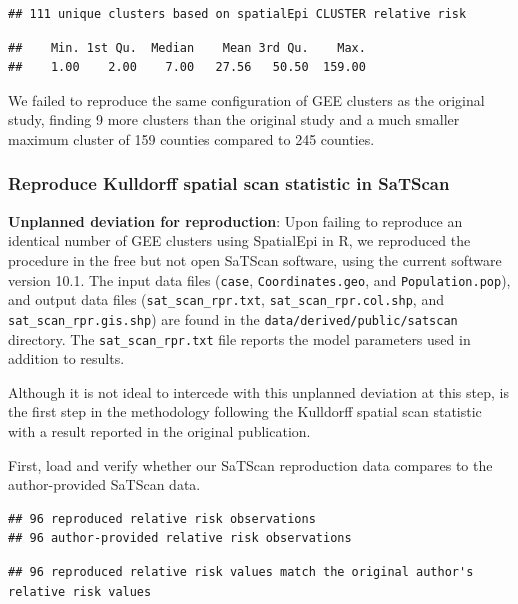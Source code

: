 \documentclass[
]{article}
\begin{document}
\begin{verbatim}
## 111 unique clusters based on spatialEpi CLUSTER relative risk
\end{verbatim}

\begin{verbatim}
##    Min. 1st Qu.  Median    Mean 3rd Qu.    Max. 
##    1.00    2.00    7.00   27.56   50.50  159.00
\end{verbatim}

We failed to reproduce the same configuration of GEE clusters as the
original study, finding 9 more clusters than the original study and a
much smaller maximum cluster of 159 counties compared to 245 counties.

\hypertarget{reproduce-kulldorff-spatial-scan-statistic-in-satscan}{%
\subsubsection{Reproduce Kulldorff spatial scan statistic in
SaTScan}\label{reproduce-kulldorff-spatial-scan-statistic-in-satscan}}

\textbf{Unplanned deviation for reproduction}: Upon failing to reproduce
an identical number of GEE clusters using SpatialEpi in R, we reproduced
the procedure in the free but not open SaTScan software, using the
current software version 10.1. The input data files (\texttt{case},
\texttt{Coordinates.geo}, and \texttt{Population.pop}), and output data
files (\texttt{sat\_scan\_rpr.txt}, \texttt{sat\_scan\_rpr.col.shp}, and
\texttt{sat\_scan\_rpr.gis.shp}) are found in the
\texttt{data/derived/public/satscan} directory. The
\texttt{sat\_scan\_rpr.txt} file reports the model parameters used in
addition to results.

Although it is not ideal to intercede with this unplanned deviation at
this step, is the first step in the methodology following the Kulldorff
spatial scan statistic with a result reported in the original
publication.

First, load and verify whether our SaTScan reproduction data compares to
the author-provided SaTScan data.

\begin{verbatim}
## 96 reproduced relative risk observations
## 96 author-provided relative risk observations
\end{verbatim}

\begin{verbatim}
## 96 reproduced relative risk values match the original author's relative risk values
\end{verbatim}
\end{document}
